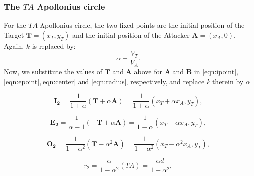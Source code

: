 \documentclass{beamer}
\begin{document}
\begin{frame}
\frametitle{The $TA$ Apollonius circle}
For the $TA$ Apollonius circle, the two fixed points are the initial position of the Target $\boldsymbol{T}=(x_{T},y_{T})$ and the initial position of the Attacker  $\boldsymbol{A}=(x_{A},0)$.
Again, $k$ is replaced by:
\begin{equation}
\alpha= \dfrac{V_{T}}{V_{A}}.
\end{equation}
Now, we substitute the values of $\boldsymbol{T}$ and $\boldsymbol{A}$ above for $\boldsymbol{A}$ and $\boldsymbol{B}$ in \eqref{eqn:ipoint},\eqref{eqn:epoint},\eqref{eqn:center} and \eqref{eqn:radius}, respectively, and replace $k$ therein by $\alpha$

\begin{equation}
\boldsymbol{I_{2}} =\dfrac{1}{1+\alpha}(\boldsymbol{T}+\alpha \boldsymbol{A}) =\dfrac{1}{1+\alpha}(x_{T}+\alpha x_{A},y_{T}),
\end{equation}

\begin{equation}
\boldsymbol{E_{2}} =\dfrac{1}{\alpha-1}(-\boldsymbol{T}+\alpha \boldsymbol{A}) =\dfrac{1}{1-\alpha}(x_{T}-\alpha x_{A},y_{T}),
\end{equation}

\begin{equation}
\boldsymbol{O_{2}} =\dfrac{1}{1-\alpha^{2}}(\boldsymbol{T}-\alpha^{2} \boldsymbol{A}) =\dfrac{1}{1-\alpha^{2}}(x_{T}-\alpha^{2} x_{A},y_{T}),
\label{O2}
\end{equation}

\begin{equation}
r_{2} =\dfrac{\alpha}{1-\alpha^{2}}(TA)
 = \dfrac{\alpha d}{1-\alpha^{2}},
 \label{r2}
\end{equation}
%
\end{frame}

\subsection{}
\end{document}
